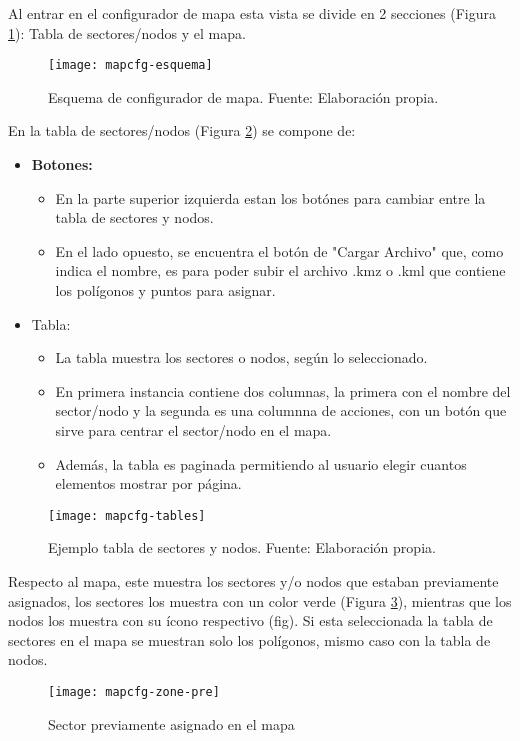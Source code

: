Al entrar en el configurador de mapa esta vista se divide en 2 secciones (Figura \ref{fig:mapcfg-esquema}): Tabla de sectores/nodos y el mapa.
\begin{figure}[H]
	\centering
	\texttt{[image: mapcfg-esquema]}
	\caption{\label{fig:mapcfg-esquema} Esquema de configurador de mapa. Fuente: Elaboración propia.}
\end{figure}

En la tabla de sectores/nodos (Figura \ref{fig:mapcfg-tables-exameple}) se compone de:

\begin{itemize}
    \item \textbf{Botones:}
          \begin{itemize}
              \item En la parte superior izquierda estan los botónes para cambiar entre la tabla de sectores y nodos.
              \item En el lado opuesto, se encuentra el botón de "Cargar Archivo" que, como indica el nombre, es para poder subir el archivo .kmz o .kml que contiene los polígonos y puntos para asignar.
          \end{itemize}
    \item Tabla:  
    \begin{itemize}
        \item La tabla muestra los sectores o nodos, según lo seleccionado.
        \item En primera instancia contiene dos columnas, la primera con el nombre del sector/nodo y la segunda es una columnna de acciones, con un botón que sirve para centrar el sector/nodo en el mapa. 
        \item Además, la tabla es paginada permitiendo al usuario elegir cuantos elementos mostrar por página.
    \end{itemize}
\end{itemize}

\begin{figure}[H]
	\centering
	\texttt{[image: mapcfg-tables]}
	\caption{\label{fig:mapcfg-tables-exameple} Ejemplo tabla de sectores y nodos. Fuente: Elaboración propia.}
\end{figure}


Respecto al mapa, este muestra los sectores y/o nodos que estaban previamente asignados, los sectores los muestra con un color verde (Figura \ref{fig:mapcfg-zone-pre}), mientras que los nodos los muestra con su ícono respectivo (fig). Si esta seleccionada la tabla de sectores en el mapa se muestran solo los polígonos, mismo caso con la tabla de nodos.
\begin{figure}[H]
	\centering
	\texttt{[image: mapcfg-zone-pre]}
	\caption{\label{fig:mapcfg-zone-pre} Sector previamente asignado en el mapa}
\end{figure}

